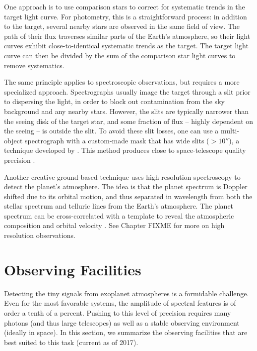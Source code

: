 \documentclass[graybox,natbib,nosecnum]{svmult}
\begin{document}
One approach is to use comparison stars to correct for systematic trends in the target light curve. For photometry, this is a straightforward process: in addition to the target, several nearby stars are observed in the same field of view. The path of their flux traverses similar parts of the Earth's atmosphere, so their light curves exhibit close-to-identical systematic trends as the target. The target light curve can then be divided by the sum of the comparison star light curves to remove systematics.  %

The same principle applies to spectroscopic observations, but requires a more specialized approach.  Spectrographs usually image the target through a slit prior to dispersing the light, in order to block out contamination from the sky background and any nearby stars. However, the slits are typically narrower than the seeing disk of the target star, and some fraction of flux -- highly dependent on the seeing -- is outside the slit.  To avoid these slit losses, one can use a multi-object spectrograph with a custom-made mask that has wide slits ($>10''$), a technique developed by \cite{bean10}. This method produces close to space-telescope quality precision \citep[e.g.][]{}.  

Another creative ground-based technique uses high resolution spectroscopy to detect the planet's atmosphere.  The idea is that the planet spectrum is Doppler shifted due to its orbital motion, and thus separated in wavelength from both the stellar spectrum and telluric lines from the Earth's atmosphere. The planet spectrum can be cross-correlated with a template to reveal the atmospheric composition and orbital velocity \citep[e.g.][]{snellen10}.  See Chapter FIXME for more on high resolution observations. 

\section{Observing Facilities}
Detecting the tiny signals from exoplanet atmospheres is a formidable challenge. Even for the most favorable systems, the amplitude of spectral features is of order a tenth of a percent. Pushing to this level of precision requires many photons (and thus large telescopes) as well as a stable observing environment (ideally in space).  In this section, we summarize the observing facilities that are best suited to this task (current as of 2017).
\end{document}
